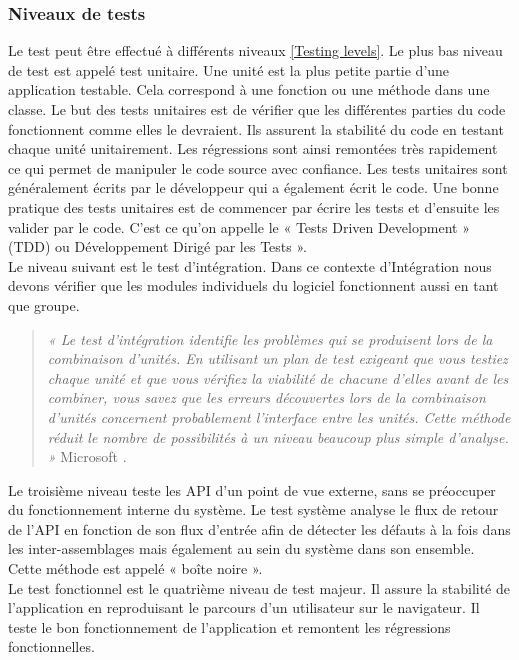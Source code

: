       \subsubsection{Niveaux de tests}
      Le test peut être effectué à différents niveaux \ref{Testing levels}. Le plus bas niveau de test est appelé test unitaire. Une unité est la plus petite partie d’une application testable. Cela correspond à une fonction ou une méthode dans une classe. Le but des tests unitaires est de vérifier que les différentes parties du code fonctionnent comme elles le devraient. Ils assurent la stabilité du code en testant chaque unité unitairement. Les régressions sont ainsi remontées très rapidement ce qui permet de manipuler le code source avec confiance. Les tests unitaires sont généralement écrits par le développeur qui a également écrit le code. Une bonne pratique des tests unitaires est de commencer par écrire les tests et d’ensuite les valider par le code. C’est ce qu’on appelle le « Tests Driven Development » (\gls{TDD}) ou Développement Dirigé par les Tests ».\\

      Le niveau suivant est le test d'intégration. Dans ce contexte d’Intégration nous devons vérifier que les modules individuels du logiciel fonctionnent aussi en tant que groupe.\\

      \begin{quotation}
        \emph{« Le test d'intégration identifie les problèmes qui se produisent lors de la combinaison d'unités. En utilisant un plan de test exigeant que vous testiez chaque unité et que vous vérifiez la viabilité de chacune d'elles avant de les combiner, vous savez que les erreurs découvertes lors de la combinaison d'unités concernent probablement l'interface entre les unités. Cette méthode réduit le nombre de possibilités à un niveau beaucoup plus simple d'analyse. »} Microsoft \cite{Mic16}.\\
      \end{quotation}

      Le troisième niveau teste les API d’un point de vue externe, sans se préoccuper du fonctionnement interne du système. Le test système analyse le flux de retour de l’API en fonction de son flux d’entrée afin de détecter les défauts à la fois dans les inter-assemblages mais également au sein du système dans son ensemble. Cette méthode est appelé « boîte noire ».\\

       Le test fonctionnel est le quatrième niveau de test majeur. Il assure la stabilité de l’application en reproduisant le parcours d’un utilisateur sur le navigateur. Il teste le bon fonctionnement de l’application et remontent les régressions fonctionnelles.\\

